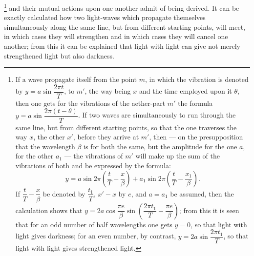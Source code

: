 \documentclass[12pt,a4paper]{book}
\begin{document}
%
%
\footnote{%
If a wave propagate itself from the point $m$, in which the vibration is denoted by
$y = a\sin\dfrac{2\pi t}{T}$, to $m'$, the way being $x$ and the time employed upon it $\theta$, then one gets for the
vibrations of the aether-part $m'$ the formula $y = a\sin\dfrac{2\pi(t-\theta)}{T}$.
If two waves are simultaneously to run through the same line, but from different starting points, so that the one
traverses the way $x$, the other $x'$, before they arrive at $m'$, then --- on the presupposition that the wavelength
$\beta$ is for both the same, but the amplitude for the one $a$, for the other $a_{1}$ --- the vibrations of $m'$ will
make up the sum of the vibrations of both and be expressed by the formula:
\[
y = a\sin 2\pi\left(\frac{t}{T}-\frac{x}{\beta}\right)
  + a_{1}\sin 2\pi\left(\frac{t}{T}-\frac{x_{1}}{\beta}\right).
\]
If $\dfrac{t}{T}-\dfrac{x}{\beta}$ be denoted by $\dfrac{t_{1}}{T}$, $x'-x$ by $e$, and $a = a_{1}$ be assumed, then the
calculation shows that
$y = 2a\cos\dfrac{\pi e}{\beta}
 \sin\left(\dfrac{2\pi t_{1}}{T}-\dfrac{\pi e}{\beta}\right)$;
from this it is seen that for an odd number of half wavelengths one gets $y = 0$, so that light with light gives
darkness; for an even number, by contrast, $y = 2a\sin\dfrac{2\pi t_{1}}{T}$, so that light with light gives
strengthened light.}
and their mutual actions upon one another admit of being derived. It can be exactly calculated how two light-waves which propagate themselves simultaneously along the same line, but from
different starting points, will meet, in which cases they will strengthen and in which cases they will cancel one
another; from this it can be explained that light with light can give not merely strengthened light but also darkness.
\end{document}
